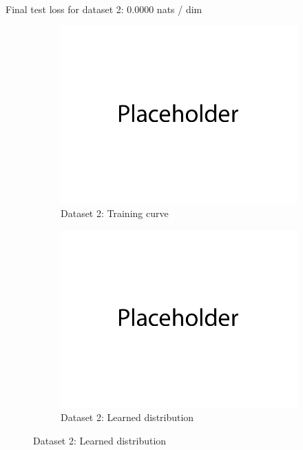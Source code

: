 \documentclass{article}
\begin{document}
\begin{enumerate}[(a)]
\begin{figure}[H]
\begin{subfigure}{0.45\textwidth}
    \end{subfigure}
\end{figure}
Final test loss for dataset 2: 0.0000  nats / dim
\begin{figure}[H]
    \centering
    \begin{subfigure}{0.45\textwidth}
        \centering
        \includegraphics[width=\textwidth]{figures/q1_b_dset2_train_plot.png}
        \caption{Dataset 2: Training curve}
    \end{subfigure}
    \hspace{0.2in}
    \begin{subfigure}{0.45\textwidth}
        \centering
        \includegraphics[width=\textwidth]{figures/q1_b_dset2_learned_dist.png}
        \caption{Dataset 2: Learned distribution}
    \end{subfigure}
\end{figure}
\end{enumerate}
\end{document}
